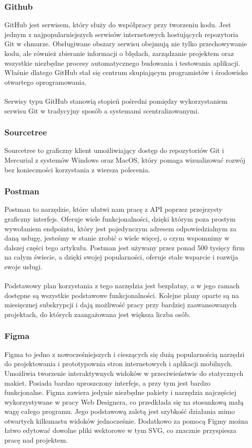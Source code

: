 \documentclass[12pt,a4paper]{article}
\begin{document}
\subsubsection{Github}
GitHub jest serwisem, który służy do współpracy przy tworzeniu kodu. Jest jednym z najpopularniejszych serwisów internetowych hostujących repozytoria Git w chmurze. Obsługiwane obszary serwisu obejmują nie tylko przechowywanie kodu, ale również zbieranie informacji o błędach, zarządzanie projektem oraz wszystkie niezbędne procesy automatycznego budowania i testowania aplikacji. Właśnie dlatego GitHub stał się centrum skupiającym programistów i środowisko otwartego oprogramowania.
\\\\
Serwisy typu GitHub stanowią stopień pośredni pomiędzy wykorzystaniem serwisu Git w tradycyjny sposób a systemami scentralizowanymi.

\subsubsection{Sourcetree}
Sourcetree to graficzny klient umożliwiający dostęp do repozytoriów Git i Mercurial z systemów Windows oraz MacOS, który pomaga wizualizować rozwój bez konieczności korzystania z wiersza polecenia.

\subsubsection{Postman}
Postman to narzędzie, które ułatwi nam pracę z API poprzez przejrzysty graficzny interfejs. Oferuje wiele funkcjonalności, dzięki którym poza prostym wywołaniem endpointu, który jest pojedynczym adresem odpowiedzialnym za daną usługę, jesteśmy w stanie zrobić o wiele więcej, o czym wspomnimy w dalszej części tego artykułu. Postman jest używany przez ponad 500 tysięcy firm na całym świecie, a dzięki swojej popularności, oferuje stałe wsparcie i rozwija swoje usługi.
\\\\
Podstawowy plan korzystania z tego narzędzia jest bezpłatny, a w jego ramach dostępne są wszystkie podstawowe funkcjonalności. Kolejne plany oparte są na miesięcznej subskrypcji i dają możliwość pracy przy bardziej zaawansowanych projektach, do których zaangażowana jest większa liczba osób.

\subsubsection{Figma}
Figma to jedno z nowocześniejszych i cieszących się dużą popularnością narzędzi do projektowania i prototypownia stron internetowych i aplikacji mobilnych. Umożliwia tworzenie interaktywnych widoków w przeciwieństwie do statycznych makiet. Posiada bardzo uproszczony interfejs, a przy tym jest bardzo funkcjonalne. Figma zawiera jedynie niezbędne pakiety i narzędzia najczęściej wykorzystywane w pracy Web Designera, co przedkłada się na stosunkową małą wagę całego programu. Jego podstawową zaletą jest szybkość działania mimo otwartych kilkunastu widoków jednocześnie. Dodatkowo za pomocą Figmy można łatwo edytować dowolne pliki wektorowe w tym SVG, co znacznie przyspiesza pracę nad projektem.
\end{document}
